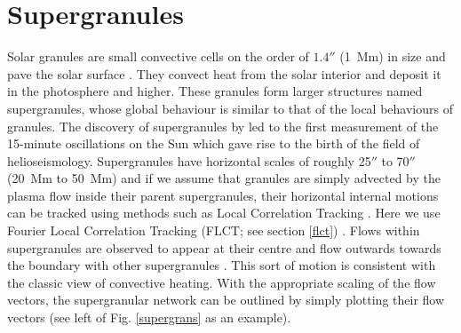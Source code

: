 \section{Supergranules}
Solar granules are small convective cells on the order of $1.4''$ (1~Mm) in size and pave the solar surface \citep{nordlund_solar_2009}. They convect heat from the solar interior and deposit it in the photosphere and higher. These granules form larger structures named supergranules, whose global behaviour is similar to that of the local behaviours of granules. The discovery of supergranules by \cite{hart_motions_1956} led to the first measurement of the 15-minute oscillations on the Sun which gave rise to the birth of the field of helioseismology.
Supergranules have horizontal scales of roughly 25$''$ to 70$''$ (20~Mm to 50~Mm) and if we assume that granules are simply advected by the plasma flow inside their parent supergranules, their horizontal internal motions can be tracked using methods such as Local Correlation Tracking \citep[LCT;][]{november_precise_1988,rincon_suns_2018}. Here we use Fourier Local Correlation Tracking (FLCT; see section \ref{flct}) . 
Flows within supergranules are observed to appear at their centre and flow outwards towards the boundary with other supergranules \citep[e.g.][]{muglach_photospheric_2021}. This sort of motion is consistent with the classic view of convective heating.
With the appropriate scaling of the flow vectors, the supergranular network can be outlined by simply plotting their flow vectors (see left of Fig. \ref{supergrans} as an example).
